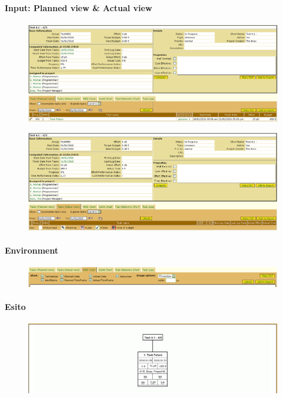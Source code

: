 \paragraph{Input: Planned view & Actual view}
\begin{figure}
\centering
\includegraphics[width=\textwidth]{tests/TEST_WBS/4.1/4.1_4_5/Esempio_2/input.png}
\end{figure}
\begin{figure}
\centering
\includegraphics[width=\textwidth]{tests/TEST_WBS/4.1/4.1_4_5/Esempio_2/input_actual.png}
\end{figure}
\newpage

\paragraph{Environment}
\begin{figure}
\centering
\includegraphics[width=\textwidth]{tests/TEST_WBS/4.1/4.1_4_5/Esempio_2/environment.png}
\end{figure}
\paragraph{Esito}
\begin{figure}
\centering
\includegraphics[width=\textwidth]{tests/TEST_WBS/4.1/4.1_4_5/Esempio_2/output.png}
\end{figure}